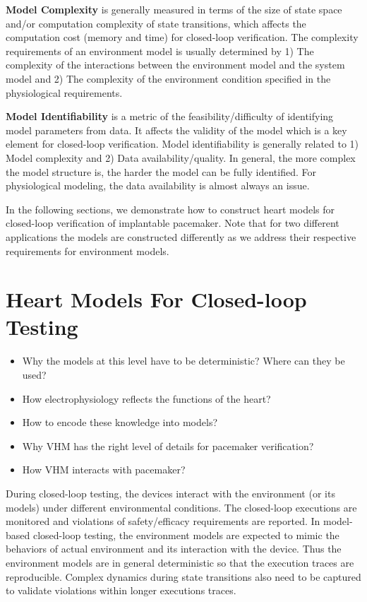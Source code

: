 \documentclass[openany]{now} %
\begin{document}
\textbf{Model Complexity} is generally measured in terms of the size of state space and/or computation complexity of state transitions, which affects the computation cost (memory and time) for closed-loop verification. The complexity requirements of an environment model is usually determined by 1) The complexity of the interactions between the environment model and the system model and 2) The complexity of the environment condition specified in the physiological requirements.

\textbf{Model Identifiability} is a metric of the feasibility/difficulty of identifying model parameters from data. It affects the validity of the model which is a key element for closed-loop verification. Model identifiability is generally related to 1) Model complexity and 2) Data availability/quality. In general, the more complex the model structure is, the harder the model can be fully identified. For physiological modeling, the data availability is almost always an issue.

In the following sections, we demonstrate how to construct heart models for closed-loop verification of implantable pacemaker. Note that for two different applications the models are constructed differently as we address their respective requirements for environment models. 


\section{Heart Models For Closed-loop Testing}
\begin{itemize}
	\item Why the models at this level have to be deterministic? Where can they be used?
    \item How electrophysiology reflects the functions of the heart?
    \item How to encode these knowledge into models?
    \item Why VHM has the right level of details for pacemaker verification?
    \item How VHM interacts with pacemaker?
    
\end{itemize}
During closed-loop testing, the devices interact with the environment (or its models) under different environmental conditions. The closed-loop executions are monitored and violations of safety/efficacy requirements are reported. In model-based closed-loop testing, the environment models are expected to mimic the behaviors of actual environment and its interaction with the device. Thus the environment models are in general deterministic so that the execution traces are reproducible. Complex dynamics during state transitions also need to be captured to validate violations within longer executions traces. 
\end{document}
